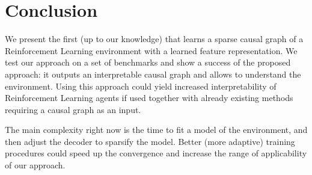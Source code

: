 \documentclass[a4paper,11pt,oneside]{report}
\begin{document}








\chapter{Conclusion}
\label{ch:conclusion}

We present the first (up to our knowledge) that learns a sparse causal graph of a Reinforcement Learning environment with a learned feature representation. We test our approach on a set of benchmarks and show a success of the proposed approach: it outputs an interpretable causal graph and allows to understand the environment. Using this approach could yield increased interpretability of Reinforcement Learning agents if used together with already existing methods requiring a causal graph as an input.

The main complexity right now is the time to fit a model of the environment, and then adjust the decoder to sparsify the model. Better (more adaptive) training procedures could speed up the convergence and increase the range of applicability of our approach.
\end{document}
